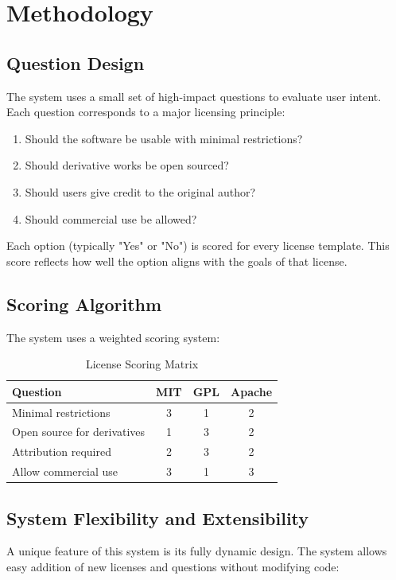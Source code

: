 \documentclass[12pt,a4paper]{report}
\begin{document}
\chapter{Methodology}
\section{Question Design}
The system uses a small set of high-impact questions to evaluate user intent. Each question corresponds to a major licensing principle:

\begin{enumerate}
    \item Should the software be usable with minimal restrictions?
    \item Should derivative works be open sourced?
    \item Should users give credit to the original author?
    \item Should commercial use be allowed?
\end{enumerate}

Each option (typically "Yes" or "No") is scored for every license template. This score reflects how well the option aligns with the goals of that license.

\section{Scoring Algorithm}
The system uses a weighted scoring system:

\begin{table}[h]
    \centering
    \begin{tabular}{lccc}
        \toprule
        Question                    & MIT & GPL & Apache \\
        \midrule
        Minimal restrictions        & 3   & 1   & 2      \\
        Open source for derivatives & 1   & 3   & 2      \\
        Attribution required        & 2   & 3   & 2      \\
        Allow commercial use        & 3   & 1   & 3      \\
        \bottomrule
    \end{tabular}
    \caption{License Scoring Matrix}
\end{table}

\section{System Flexibility and Extensibility}
A unique feature of this system is its fully dynamic design. The system allows easy addition of new licenses and questions without modifying code:
\end{document}

